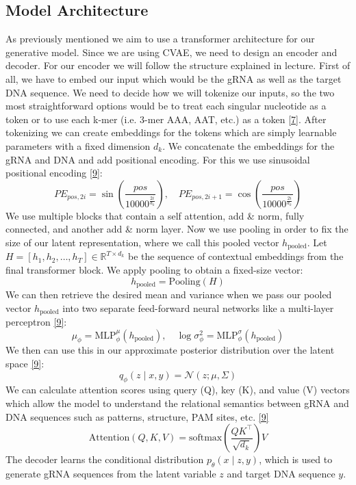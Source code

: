 \documentclass{article}
\begin{document}
\subsection{Model Architecture}
As previously mentioned we aim to use a transformer architecture for our generative model. Since we are using CVAE, we need to design an encoder and decoder. For our encoder we will follow the structure explained in lecture. First of all, we have to embed our input which would be the gRNA as well as the target DNA sequence. We need to decide how we will tokenize our inputs, so the two most straightforward options would be to treat each singular nucleotide as a token or to use each k-mer (i.e. 3-mer AAA, AAT, etc.) as a token \hyperref[Reference 7]{[7]}. After tokenizing we can create embeddings for the tokens which are simply learnable parameters with a fixed dimension $ d_{k} $. We concatenate the embeddings for the gRNA and DNA and add positional encoding. For this we use sinusoidal positional encoding \hyperref[Reference 9]{[9]}: 
\[
PE_{pos,2i} = \sin{(\frac{pos}{10000^{\frac{2i}{d_{k}}}})}, \quad 
PE_{pos,2i+1} = \cos{(\frac{pos}{10000^{\frac{2i}{d_{k}}}})}
\]
We use multiple blocks that contain a self attention, add \& norm, fully connected, and another add \& norm layer. 
Now we use pooling in order to fix the size of our latent representation, where we call this pooled vector $h_{\text{pooled}} $. 
Let $ H = [h_1, h_2, \ldots, h_T] \in \mathbb{R}^{T \times d_k} $ be the sequence of contextual embeddings from the final transformer block. We apply pooling to obtain a fixed-size vector:
\[
h_{\text{pooled}} = \text{Pooling}(H)
\]
We can then retrieve the desired mean and variance when we pass our pooled vector $h_{\text{pooled}}$ into two separate feed-forward neural networks like a multi-layer perceptron \hyperref[Reference 9]{[9]}:
\[
\mu_{\phi} = \text{MLP}_\phi^\mu(h_{\text{pooled}}), \quad \log \sigma_{\phi}^2 = \text{MLP}_\phi^\sigma(h_{\text{pooled}})
\]
We then can use this in our approximate posterior distribution over the latent space \hyperref[Reference 9]{[9]}:
\[
q_\phi(z \mid x, y) = \mathcal{N}(z; \mu, \Sigma)
\]
We can calculate attention scores using query (Q), key (K), and value (V) vectors which allow the model to understand the relational semantics between gRNA and DNA sequences such as patterns, structure, PAM sites, etc. \hyperref[Reference 9]{[9]}
\[
\text{Attention}(Q, K, V) = \text{softmax}\left(\frac{QK^\top}{\sqrt{d_k}}\right) V
\]
The decoder learns the conditional distribution $p_{\theta}(x \mid z, y)$, which is used to generate gRNA sequences from the latent variable $z$ and target DNA sequence $y$.
\end{document}
